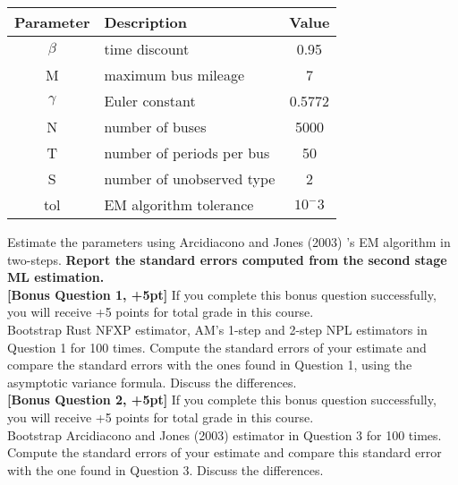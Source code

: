\documentclass[paper=a4, fontsize=13pt]{extarticle} %
\numberwithin{equation}{section} %
\numberwithin{figure}{section} %
\numberwithin{table}{section} %
\begin{document}
\begin{table}[H]
\centering
\begin{tabular}{c L{5cm} c}
\hline
Parameter & Description & Value \\
\hline
$\beta$ & time discount & 0.95 \\
M & maximum bus mileage & 7 \\
$\gamma$ & Euler constant & 0.5772 \\
N & number of buses & 5000 \\
T & number of periods per bus & 50 \\
S & number of unobserved type & 2 \\
tol & EM algorithm tolerance & $10^-3$ \\
\hline
\end{tabular}
\end{table}

Estimate the parameters using Arcidiacono and Jones (2003) 's EM algorithm in two-steps. \textbf{Report the standard errors computed from the second stage ML estimation.} \\


\vspace{0.2in}
\textbf{[Bonus Question 1, +5pt]} \indent If you complete this bonus question successfully, you will receive +5 points for total grade in this course. \\
Bootstrap Rust NFXP estimator, AM's 1-step and 2-step NPL estimators in Question 1 for 100 times. Compute the standard errors of your estimate and compare the standard errors with the ones found in Question 1, using the asymptotic variance formula. Discuss the differences. \\

\vspace{0.2in}
\textbf{[Bonus Question 2, +5pt]} \indent If you complete this bonus question successfully, you will receive +5 points for total grade in this course. \\
Bootstrap Arcidiacono and Jones (2003) estimator in Question 3 for 100 times. Compute the standard errors of your estimate and compare this standard error with the one found in Question 3. Discuss the differences.\\
\end{document}
